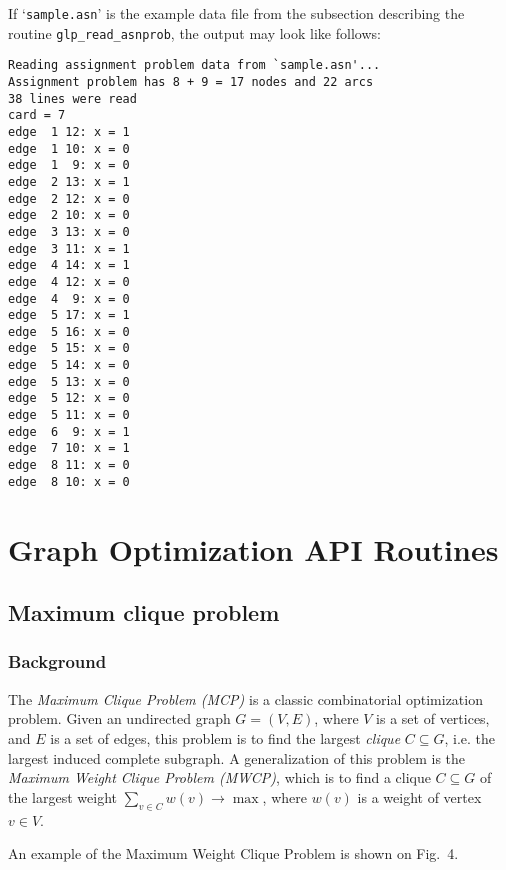 \documentclass[dvipdfm,11pt]{report}
\begin{document}
If `\verb|sample.asn|' is the example data file from the subsection
describing the routine \verb|glp_read_asnprob|, the output may look
like follows:

\begin{footnotesize}
\begin{verbatim}
Reading assignment problem data from `sample.asn'...
Assignment problem has 8 + 9 = 17 nodes and 22 arcs
38 lines were read
card = 7
edge  1 12: x = 1
edge  1 10: x = 0
edge  1  9: x = 0
edge  2 13: x = 1
edge  2 12: x = 0
edge  2 10: x = 0
edge  3 13: x = 0
edge  3 11: x = 1
edge  4 14: x = 1
edge  4 12: x = 0
edge  4  9: x = 0
edge  5 17: x = 1
edge  5 16: x = 0
edge  5 15: x = 0
edge  5 14: x = 0
edge  5 13: x = 0
edge  5 12: x = 0
edge  5 11: x = 0
edge  6  9: x = 1
edge  7 10: x = 1
edge  8 11: x = 0
edge  8 10: x = 0
\end{verbatim}
\end{footnotesize}


\chapter{Graph Optimization API Routines}

\section{Maximum clique problem}

\subsection{Background}

The {\it Maximum Clique Problem (MCP)} is a classic combinatorial
optimization problem. Given an undirected graph $G=(V,E)$, where $V$ is
a set of vertices, and $E$ is a set of edges, this problem is to find
the largest {\it clique} $C\subseteq G$, i.e. the largest induced
complete subgraph. A generalization of this problem is the {\it Maximum
Weight Clique Problem (MWCP)}, which is to find a clique $C\subseteq G$
of the largest weight $\displaystyle\sum_{v\in C}w(v)\rightarrow\max$,
where $w(v)$ is a weight of vertex $v\in V$.

An example of the Maximum Weight Clique Problem is shown on Fig.~4.
\end{document}

